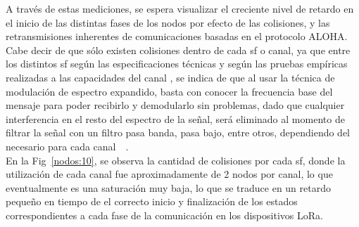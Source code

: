 \begin{justify}
A través de estas mediciones, se espera visualizar el creciente nivel de retardo en el inicio de las distintas fases de los nodos por efecto de las colisiones, y las retransmisiones inherentes de comunicaciones basadas en el protocolo ALOHA. Cabe decir de que sólo existen colisiones dentro de cada \gls{sf} o canal, ya que entre los distintos \gls{sf} según las especificaciones técnicas  y según las pruebas empíricas realizadas a las capacidades del canal , se indica de que al usar la técnica de modulación de espectro expandido, basta con conocer la frecuencia base del mensaje para poder recibirlo y demodularlo sin problemas, dado que cualquier interferencia en el resto del espectro de la señal, será eliminado al momento de filtrar la señal con un filtro pasa banda, pasa bajo, entre otros, dependiendo del necesario para cada canal~\cite{Sornin}~\cite{Xavier}.\\
En la Fig~\ref{nodos:10}, se observa la cantidad de colisiones por cada \gls{sf}, donde la utilización de cada canal fue aproximadamente de 2 nodos por canal, lo que eventualmente es una saturación muy baja, lo que se traduce en un retardo pequeño en tiempo de el correcto inicio y finalización de los estados correspondientes a cada fase de la comunicación en los dispositivos LoRa.


\end{justify}

